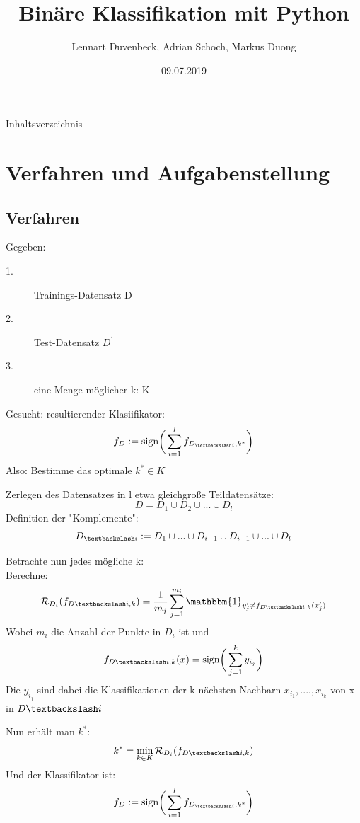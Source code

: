 \documentclass{beamer}
\title{Binäre Klassifikation mit Python}
\author{Lennart Duvenbeck, Adrian Schoch, Markus Duong}
\date{09.07.2019}
\begin{document}
\maketitle
\begin{frame}{Inhaltsverzeichnis}
  \tableofcontents
\end{frame}

\section{Verfahren und Aufgabenstellung}

\subsection{Verfahren}
\begin{frame}
Gegeben: 
\begin{description}
\item[1.] Trainings-Datensatz D
\item[2.] Test-Datensatz $D^{'}$
\item[3.] eine Menge möglicher k: K
\end{description}
Gesucht: resultierender Klasiifikator: 
\[
f_ {D} := \text{sign} \bigg( \sum_{i=1}^{l} f_{D_{\textbackslash i}, k^{*}}\bigg)
\]
Also: Bestimme das optimale $k^* \in K$
\end{frame}



\begin{frame}
Zerlegen des Datensatzes in l etwa gleichgroße Teildatensätze:
\[
D= D_1 \cup D_2 \cup ... \cup D_l
\]
Definition der "Komplemente":
\[
D_{\textbackslash i} := D_{1} \cup ... \cup D_{i-1} \cup D_{i+1} \cup...\cup D_{l}
\]
\end{frame}


\begin{frame}
Betrachte nun jedes mögliche k:\\
Berechne:
\[ \mathcal{R}_{D_i}(f_{D \textbackslash i ,k})= \frac{1}{m_j} \sum_{j=1}^{m_i} \mathbbm{1}_{y_{j}' \neq f_{D \textbackslash i ,k}(x_{j}')}
\]
Wobei $m_i$ die Anzahl der Punkte in $D_i$ ist und  
\[f_{D \textbackslash i ,k}(x) = \text{sign} \bigg( \sum_{j =1}^{k} y_{i_{j}}\bigg)
\]
Die $y_{i_j}$ sind dabei die Klassifikationen der k nächsten Nachbarn 
$x_{i_1},....,x_{i_k}$ von x in $D \textbackslash i$
\end{frame}

\begin{frame}
Nun erhält man $k^*$: 
\[k^* = \min \limits_{k \in K} \mathcal{R}_{D_i}(f_{D \textbackslash i ,k})
\]
Und der Klassifikator ist:
\[f_ {D} := \text{sign} \bigg( \sum_{i=1}^{l} f_{D_{\textbackslash i}, k^{*}}\bigg)
\]
\end{frame}
\end{document}
